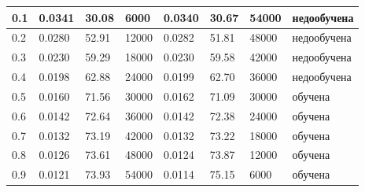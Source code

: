 \documentclass[12pt]{report}
\begin{document}
\begin{table}[!h]
\begin{center}
\begin{tabular}{|l|l|l|l|l|l|l|l|}
\hline 0.1 & 0.0341 & 30.08 & 6000 & 0.0340 & 30.67 & 54000 & недообучена \\
\hline 0.2 & 0.0280 & 52.91 & 12000 & 0.0282 & 51.81 & 48000 & недообучена \\
\hline 0.3 & 0.0230 & 59.29 & 18000 & 0.0230 & 59.58 & 42000 & недообучена \\
\hline 0.4 & 0.0198 & 62.88 & 24000 & 0.0199 & 62.70 & 36000 & недообучена \\
\hline 0.5 & 0.0160 & 71.56 & 30000 & 0.0162 & 71.09 & 30000 & обучена\\
\hline 0.6 & 0.0142 & 72.64 & 36000 & 0.0142 & 72.38 & 24000 & обучена\\
\hline 0.7 & 0.0132 & 73.19 & 42000 & 0.0132 & 73.22 & 18000 & обучена\\
\hline 0.8 & 0.0126 & 73.61 & 48000 & 0.0124 & 73.87 & 12000 & обучена\\
\hline 0.9 & 0.0121 & 73.93 & 54000 & 0.0114 & 75.15 & 6000 & обучена\\
\hline
	\end{tabular}
	\end{center}
\end{table}
\end{document}
